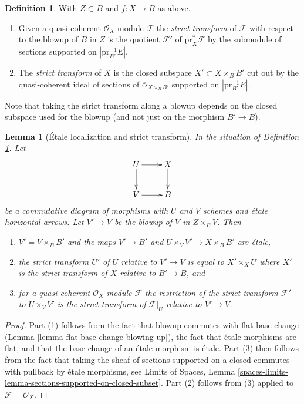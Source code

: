 \documentclass{stacks-project}
\theoremstyle{plain}
\newtheorem{lemma}[subsection]{Lemma}
\theoremstyle{definition}
\newtheorem{definition}[subsection]{Definition}
\theoremstyle{remark}
\numberwithin{equation}{subsection}
\begin{document}
\begin{definition}
\label{definition-strict-transform}
With $Z \subset B$ and $f : X \to B$ as above.
\begin{enumerate}
\item Given a quasi-coherent $\mathcal{O}_X$-module $\mathcal{F}$
the {\it strict transform} of $\mathcal{F}$ with respect to the blowup
of $B$ in $Z$ is the quotient $\mathcal{F}'$ of $\text{pr}_X^*\mathcal{F}$
by the submodule of sections supported on $|\text{pr}_{B'}^{-1}E|$.
\item The {\it strict transform} of $X$ is the closed subspace
$X' \subset X \times_B B'$ cut out by the quasi-coherent ideal of
sections of $\mathcal{O}_{X \times_B B'}$ supported on
$|\text{pr}_{B'}^{-1}E|$.
\end{enumerate}
\end{definition}

\noindent
Note that taking the strict transform along a blowup depends on the
closed subspace used for the blowup
(and not just on the morphism $B' \to B$).

\begin{lemma}[\'Etale localization and strict transform]
\label{lemma-strict-transform-local}
In the situation of Definition \ref{definition-strict-transform}.
Let
$$
\xymatrix{
U \ar[r] \ar[d] & X \ar[d] \\
V \ar[r] & B
}
$$
be a commutative diagram of morphisms with $U$ and $V$ schemes and
\'etale horizontal arrows. Let $V' \to V$ be the blowup of $V$
in $Z \times_B V$. Then
\begin{enumerate}
\item $V' = V \times_B B'$ and the maps
$V' \to B'$ and $U \times_V V' \to X \times_B B'$ are \'etale,
\item the strict transform $U'$ of $U$ relative to $V' \to V$
is equal to $X' \times_X U$ where $X'$ is the strict transform of $X$
relative to $B' \to B$, and
\item for a quasi-coherent $\mathcal{O}_X$-module $\mathcal{F}$ the
restriction of the strict transform $\mathcal{F}'$ to
$U \times_V V'$ is the strict transform of $\mathcal{F}|_U$ relative
to $V' \to V$.
\end{enumerate}
\end{lemma}

\begin{proof}
Part (1) follows from the fact that blowup commutes with flat base
change (Lemma \ref{lemma-flat-base-change-blowing-up}), the fact that
\'etale morphisms are flat, and that the base change of an \'etale
morphism is \'etale. Part (3) then follows from the fact that taking
the sheaf of sections supported on a closed commutes with pullback
by \'etale morphisms, see Limits of Spaces, Lemma
\ref{spaces-limits-lemma-sections-supported-on-closed-subset}.
Part (2) follows from (3) applied to $\mathcal{F} = \mathcal{O}_X$.
\end{proof}
\end{document}
